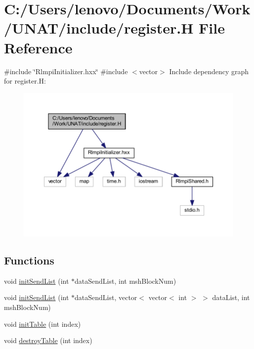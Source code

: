 \hypertarget{include_2register_8H}{}\section{C\+:/\+Users/lenovo/\+Documents/\+Work/\+U\+N\+A\+T/include/register.H File Reference}
\label{include_2register_8H}
{\ttfamily \#include \char`\"{}Rlmpi\+Initializer.\+hxx\char`\"{}}\newline
{\ttfamily \#include $<$vector$>$}\newline
Include dependency graph for register.\+H\+:
\nopagebreak
\begin{figure}[H]
\begin{center}
\leavevmode
\includegraphics[width=350pt]{include_2register_8H__incl}
\end{center}
\end{figure}
\subsection*{Functions}
\begin{DoxyCompactItemize}
\item 
void \mbox{\hyperlink{include_2register_8H_a4e113cf30f6198d50fb212074effcc61}{init\+Send\+List}} (int $\ast$data\+Send\+List, int msh\+Block\+Num)
\item 
void \mbox{\hyperlink{include_2register_8H_ace23239002b4fdf135d4ad20ae2df6e7}{init\+Send\+List}} (int $\ast$data\+Send\+List, vector$<$ vector$<$ int $>$ $>$ data\+List, int msh\+Block\+Num)
\item 
void \mbox{\hyperlink{include_2register_8H_a14fad51cfceca5a582218c98bdb3d769}{init\+Table}} (int index)
\item 
void \mbox{\hyperlink{include_2register_8H_a099f07ebad307cc1509766f32cfcba5f}{destroy\+Table}} (int index)
\end{DoxyCompactItemize}
